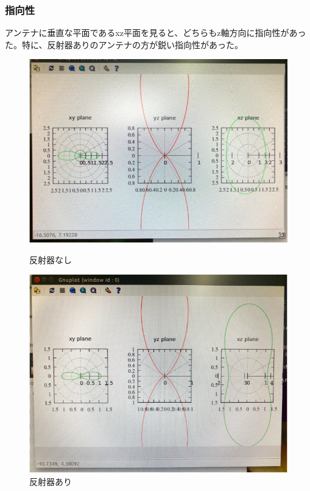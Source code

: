 \documentclass[dvipdfmx,autodetect-engine,titlepage]{jsarticle}
\begin{document}
\subsubsection{指向性}
アンテナに垂直な平面であるxz平面を見ると、どちらもz軸方向に指向性があった。特に、反射器ありのアンテナの方が鋭い指向性があった。\\
\begin{figure}[H]
  \centering
  \begin{minipage}[b]{0.45\linewidth}
  \begin{center}
    \includegraphics[keepaspectratio,scale=0.5]{fg13.png}
    \end{center}
    \caption{反射器なし}
  \end{minipage}
  \begin{minipage}[b]{0.45\linewidth}
  \begin{center}
    \includegraphics[keepaspectratio,scale=0.5]{fg14.png}
    \end{center}
    \caption{反射器あり}
  \end{minipage}
\end{figure}
\end{document}
